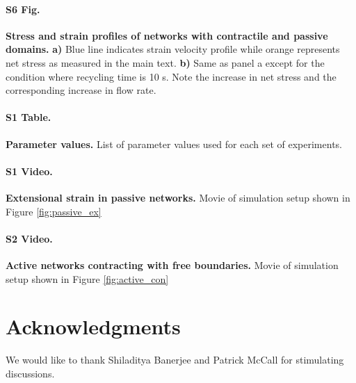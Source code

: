 \documentclass[10pt,letterpaper]{article}
\begin{document}
\paragraph*{S6 Fig.}
\label{fig:combo_prof}
{\bf Stress and strain profiles of networks with contractile and passive domains.}    \textbf{a)} Blue line indicates strain velocity profile while orange represents net stress as measured in the main text. \textbf{b)} Same as panel a except for the condition where recycling time is 10 s.  Note the increase in net stress and the corresponding increase in flow rate. 

\paragraph*{S1 Table.}
\label{S1_Table}
{\bf Parameter values.}  List of parameter values used for each set of experiments.

\paragraph*{S1 Video.}
\label{passive_ex_video}
{\bf Extensional strain in passive networks.}  Movie of simulation setup shown in Figure \ref{fig:passive_ex}

\paragraph*{S2 Video.}
\label{active_con_video}
{\bf Active networks contracting with free boundaries.}  Movie of simulation setup shown in Figure \ref{fig:active_con}

\section*{Acknowledgments}
We would like to thank Shiladitya Banerjee and Patrick McCall for stimulating discussions.

\nolinenumbers

% 


\end{document}
